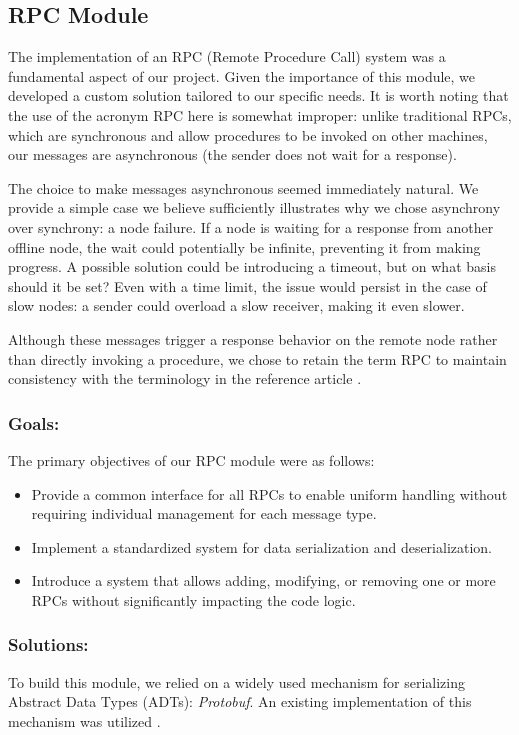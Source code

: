 \subsection{RPC Module} \label{RPCmodule}
The implementation of an RPC (Remote Procedure Call) system was a fundamental aspect of our project. 
Given the importance of this module, we developed a custom solution tailored to our specific needs. 
It is worth noting that the use of the acronym RPC here is somewhat improper: unlike traditional RPCs, 
which are synchronous and allow procedures to be invoked on other machines, our messages are 
asynchronous (the sender does not wait for a response).

The choice to make messages asynchronous seemed immediately natural. We provide a simple case we 
believe sufficiently illustrates why we chose asynchrony over synchrony: a node failure. If a node 
is waiting for 
a response from another offline node, the wait could potentially be infinite, 
preventing it from making progress. A possible solution could be introducing a timeout, but on what 
basis should it be set? Even with a time limit, the issue would persist in the case of slow nodes: 
a sender could overload a slow receiver, making it even slower.

Although these messages trigger a response behavior 
on the remote node rather than directly invoking a procedure, we chose to retain the term RPC 
to maintain consistency with the terminology in the reference article \cite{1}.

\subsubsection{Goals:\\}
The primary objectives of our RPC module were as follows:
\begin{itemize}
	\item Provide a common interface for all RPCs to enable uniform handling without requiring individual management for each message type.
	\item Implement a standardized system for data serialization and deserialization.
	\item Introduce a system that allows adding, modifying, or removing one or more RPCs without significantly impacting the code logic.
\end{itemize}

\subsubsection{Solutions:\\}
To build this module, we relied on a widely used mechanism for serializing Abstract Data Types 
(ADTs): \textit{Protobuf}. An existing implementation of this mechanism was utilized \cite{3}.

